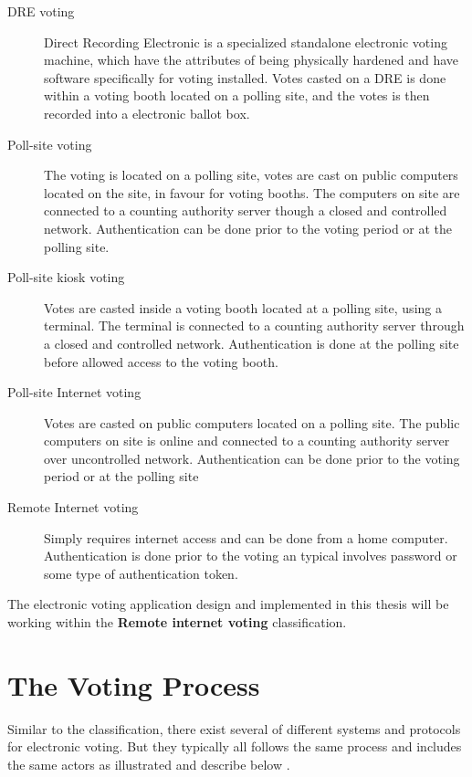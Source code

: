 \begin{description}
\item[DRE voting] Direct Recording Electronic is a specialized standalone electronic voting machine, which have the attributes of being physically hardened and have software specifically for voting installed. Votes casted on a DRE is done within a voting booth located on a polling site, and the votes is then recorded into a electronic ballot box.

\item[Poll-site voting] The voting is located on a polling site, votes are cast on public computers located on the site, in favour for voting booths. The computers on site are connected to a counting authority server though a closed and controlled network. Authentication can be done prior to the voting period or at the polling site.

\item[Poll-site kiosk voting] Votes are casted inside a voting booth located at a polling site, using a terminal. The terminal is connected to a counting authority server through a closed and controlled network. Authentication is done at the polling site before allowed access to the voting booth. 

\item[Poll-site Internet voting] Votes are casted on public computers located on a polling site. The public computers on site is online and connected to a counting authority server over uncontrolled network. Authentication can be done prior to the voting period or at the polling site

\item[Remote Internet voting] Simply requires internet access and can be done from a home computer. Authentication is done prior to the voting an typical involves password or some type of authentication token. 

\end{description}

\noindent
The electronic voting application design and implemented in this thesis will be working within the \textbf{Remote internet voting} classification. 


\section{The Voting Process} \label{sec:the_voting_process}
Similar to the classification, there exist several of different systems and protocols for electronic voting. But they typically all follows the same process and includes the same actors as illustrated and describe below \cite{Cet09}. 

